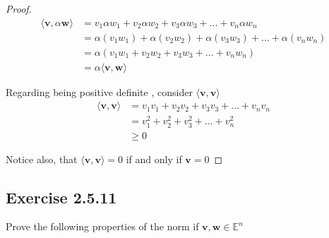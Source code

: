 \documentclass{tufte-book}
\theoremstyle{mytheoremstyle}
\theoremstyle{mylemstyle}
\theoremstyle{mydefstyle}
\begin{document}
\begin{proof}
\begin{align*}
\langle \mathbf{v}, \alpha \mathbf{w} \rangle &= v_1 \alpha w_1 + v_2 \alpha w_2 + v_3 \alpha w_3 +...+ v_n \alpha w_n \\
&= \alpha(v_1w_1) + \alpha(v_2w_2) + \alpha(v_3w_3) +...+\alpha(v_nw_n) \\
&=\alpha (v_1w_1 + v_2w_2 + v_3w_3 +...+v_nw_n) \\
&= \alpha \langle \mathbf{v}, \mathbf{w} \rangle
\end{align*}

Regarding being positive definite , consider $\langle\mathbf{v}, \mathbf{v}\rangle$
\begin{align*}
\langle\mathbf{v}, \mathbf{v}\rangle &= v_1v_1 + v_2v_2 + v_3v_3 +...+v_nv_n \\
&= v_1^2 + v_2^2 + v_3^2 +...+v_n^2\\
&\geq 0
\end{align*}

Notice also, that $\langle\mathbf{v}, \mathbf{v}\rangle = 0$ if and only if $\mathbf{v} = 0$

\end{proof}

\subsection{Exercise 2.5.11}
Prove the following properties of the norm if $\mathbf{v},\mathbf{w} \in \mathbb{E}^n$
\end{document}
